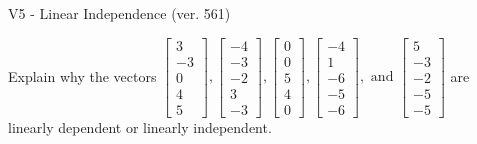 \begin{exercise}
  \begin{exerciseTitle}V5 - Linear Independence (ver. 561)\end{exerciseTitle}
  \begin{exerciseStatement}
    Explain why the vectors \(\left[\begin{array}{r}
3 \\
-3 \\
0 \\
4 \\
5
\end{array}\right] , \left[\begin{array}{r}
-4 \\
-3 \\
-2 \\
3 \\
-3
\end{array}\right] , \left[\begin{array}{r}
0 \\
0 \\
5 \\
4 \\
0
\end{array}\right] , \left[\begin{array}{r}
-4 \\
1 \\
-6 \\
-5 \\
-6
\end{array}\right] , \text{ and } \left[\begin{array}{r}
5 \\
-3 \\
-2 \\
-5 \\
-5
\end{array}\right]\) are linearly dependent or linearly independent.	



\end{exerciseStatement}
\end{exercise}
